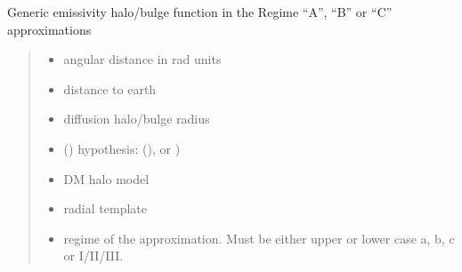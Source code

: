 \documentclass[letterpaper,10pt,english]{sphinxmanual}
\begin{document}
\begin{fulllineitems}
\label{\detokenize{diffsph.profiles:diffsph.profiles.hfactors.H_brightness}}
\pysigstartsignatures
{}
\pysigstopsignatures
\sphinxAtStartPar
Generic emissivity halo/bulge function in the Regime “A”, “B” or “C” approximations
\begin{quote}\begin{description}
\begin{itemize}
\item {} 
\sphinxAtStartPar
{} \textendash{} angular distance in rad units

\item {} 
\sphinxAtStartPar
{} \textendash{} distance to earth

\item {} 
\sphinxAtStartPar
{} \textendash{} diffusion halo/bulge radius

\item {} 
\sphinxAtStartPar
{} () \textendash{} hypothesis:  (),  or )

\item {} 
\sphinxAtStartPar
{} \textendash{} DM halo model

\item {} 
\sphinxAtStartPar
{} \textendash{} radial template

\item {} 
\sphinxAtStartPar
{} \textendash{} regime of the approximation. Must be either upper or lower case a, b, c or I/II/III.

\end{itemize}


\end{description}
\end{quote}
\end{fulllineitems}
\end{document}
